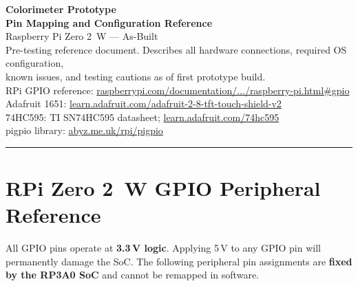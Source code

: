 \documentclass[11pt,a4paper]{article}
\begin{document}
\begin{center}
  {\LARGE\bfseries\color{hdr} Colorimeter Prototype\\[4pt]
   Pin Mapping and Configuration Reference}\\[6pt]
  {\large Raspberry Pi Zero 2~W --- As-Built}\\[4pt]
  {\normalsize Pre-testing reference document.
   Describes all hardware connections, required OS configuration,\\
   known issues, and testing cautions as of first prototype build.}\\[4pt]
  {\small\color{gray}
   RPi GPIO reference:
   \href{https://www.raspberrypi.com/documentation/computers/raspberry-pi.html\#gpio}%
   {raspberrypi.com/documentation/.../raspberry-pi.html\#gpio}\\
   Adafruit 1651:
   \href{https://learn.adafruit.com/adafruit-2-8-tft-touch-shield-v2}%
   {learn.adafruit.com/adafruit-2-8-tft-touch-shield-v2}\\
   74HC595: TI SN74HC595 datasheet;
   \href{https://learn.adafruit.com/74hc595}{learn.adafruit.com/74hc595}\\
   pigpio library:
   \href{http://abyz.me.uk/rpi/pigpio/}{abyz.me.uk/rpi/pigpio}}
\end{center}
\vspace{4pt}\hrule\vspace{8pt}

\section{RPi Zero 2~W GPIO Peripheral Reference}
\label{sec:gpioref}

All GPIO pins operate at \textbf{3.3\,V logic}.
Applying 5\,V to any GPIO pin will permanently damage the SoC.
The following peripheral pin assignments are \textbf{fixed by the RP3A0 SoC}
and cannot be remapped in software.
\end{document}
